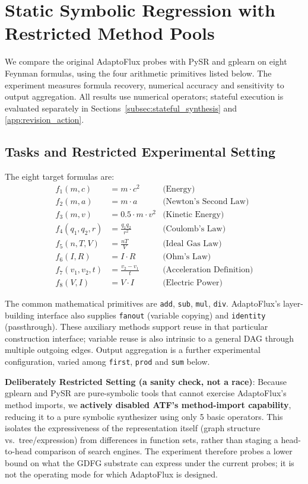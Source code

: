 \section{Static Symbolic Regression with Restricted Method Pools}
\label{sec:appendix_baseline_comparison}

We compare the original AdaptoFlux probes with PySR and gplearn on eight Feynman formulas, using the four arithmetic primitives listed below. The experiment measures formula recovery, numerical accuracy and sensitivity to output aggregation. All results use numerical operators; stateful execution is evaluated separately in Sections~\ref{subsec:stateful_synthesis} and \ref{app:revision_action}.

\subsection{Tasks and Restricted Experimental Setting}

The eight target formulas are:
\begin{align*}
    f_1(m, c) &= m \cdot c^2 & \text{(Energy)} \\
    f_2(m, a) &= m \cdot a & \text{(Newton's Second Law)} \\
    f_3(m, v) &= 0.5 \cdot m \cdot v^2 & \text{(Kinetic Energy)} \\
    f_4(q_1, q_2, r) &= \frac{q_1 q_2}{r^2} & \text{(Coulomb's Law)} \\
    f_5(n, T, V) &= \frac{n T}{V} & \text{(Ideal Gas Law)} \\
    f_6(I, R) &= I \cdot R & \text{(Ohm's Law)} \\
    f_7(v_1, v_2, t) &= \frac{v_2 - v_1}{t} & \text{(Acceleration Definition)} \\
    f_8(V, I) &= V \cdot I & \text{(Electric Power)}
\end{align*}

The common mathematical primitives are \texttt{add}, \texttt{sub}, \texttt{mul}, \texttt{div}.
AdaptoFlux's layer-building interface also supplies \texttt{fanout} (variable copying) and \texttt{identity} (passthrough). These auxiliary methods support reuse in that particular construction interface; variable reuse is also intrinsic to a general DAG through multiple outgoing edges. Output aggregation is a further experimental configuration, varied among \texttt{first}, \texttt{prod} and \texttt{sum} below.

\textbf{Deliberately Restricted Setting (a sanity check, not a race)}: Because gplearn and PySR are pure-symbolic tools that cannot exercise AdaptoFlux's method imports, we \textbf{actively disabled ATF's method-import capability}, reducing it to a pure symbolic synthesizer using only 5 basic operators. This isolates the expressiveness of the representation itself (graph structure vs.\ tree/expression) from differences in function sets, rather than staging a head-to-head comparison of search engines. The experiment therefore probes a lower bound on what the GDFG substrate can express under the current probes; it is not the operating mode for which AdaptoFlux is designed.

